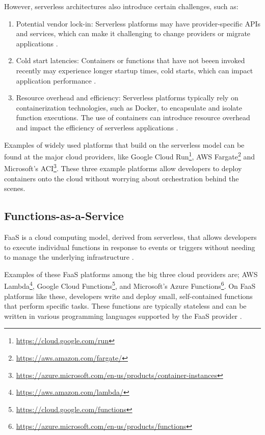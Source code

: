 \documentclass[
  table]{report}
\providecommand{\tightlist}{%
  \setlength{\itemsep}{0pt}\setlength{\parskip}{0pt}}
\begin{document}
However, serverless architectures also introduce certain challenges,
such as:

\begin{enumerate}
\def\labelenumi{\arabic{enumi}.}
\tightlist
\item
  Potential vendor lock-in: Serverless platforms may have
  provider-specific APIs and services, which can make it challenging to
  change providers or migrate applications
  \citep{gottliebServerlessDataLockin2018}.
\item
  Cold start latencies: Containers or functions that have not beeen
  invoked recently may experience longer startup times, cold starts,
  which can impact application performance
  \citep{golecColdStartLatency2023}.
\item
  Resource overhead and efficiency: Serverless platforms typically rely
  on containerization technologies, such as Docker, to encapsulate and
  isolate function executions. The use of containers can introduce
  resource overhead and impact the efficiency of serverless applications
  \citep{akkusSANDHighPerformanceServerless2018}.
\end{enumerate}

Examples of widely used platforms that build on the serverless model can
be found at the major cloud providers, like Google Cloud Run\footnote{\url{https://cloud.google.com/run}},
\ac{AWS} Fargate\footnote{\url{https://aws.amazon.com/fargate/}} and
Microsoft's \ac{ACI}\footnote{\url{https://azure.microsoft.com/en-us/products/container-instances}}.
These three example platforms allow developers to deploy containers onto
the cloud without worrying about orchestration behind the scenes.

\subsection{Functions-as-a-Service}

\ac{FaaS} is a cloud computing model, derived from serverless, that
allows developers to execute individual functions in response to events
or triggers without needing to manage the underlying infrastructure
\citep{sewakWinningEraServerless2018}.

Examples of these \ac{FaaS} platforms among the big three cloud
providers are; \ac{AWS} Lambda\footnote{\url{https://aws.amazon.com/lambda/}},
Google Cloud Functions\footnote{\url{https://cloud.google.com/functions}},
and Microsoft's Azure Functions\footnote{\url{https://azure.microsoft.com/en-us/products/functions}}.
On FaaS platforms like these, developers write and deploy small,
self-contained functions that perform specific tasks. These functions
are typically stateless and can be written in various programming
languages supported by the FaaS provider
\citep{baldiniServerlessComputingCurrent2017}.
\end{document}

